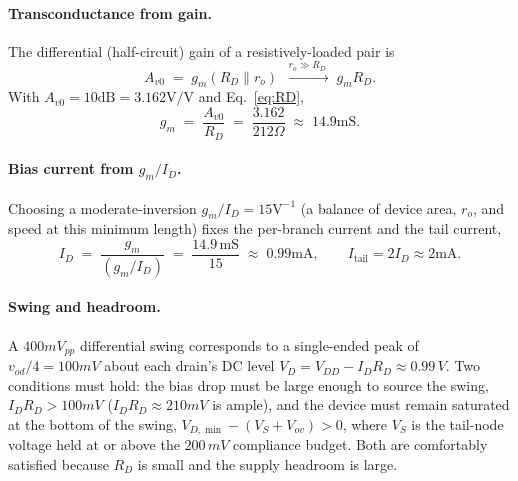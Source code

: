 \documentclass{article}
\begin{document}
\paragraph{Transconductance from gain.} The differential (half-circuit) gain of a
resistively-loaded pair is
\begin{equation}
    A_{v0} \;=\; g_m(R_D \| r_o) \;\xrightarrow{\;r_o \gg R_D\;}\; g_m R_D .
    \label{eq:gain}
\end{equation}
With $A_{v0}=10\mathrm{dB}=3.162\mathrm{V/V}$ and Eq.~\eqref{eq:RD},
\begin{equation}
    g_m \;=\; \frac{A_{v0}}{R_D} \;=\; \frac{3.162}{212\Omega} \;\approx\; 14.9\mathrm{mS}.
    \label{eq:gm}
\end{equation}

\paragraph{Bias current from $g_m/I_D$.} Choosing a moderate-inversion
$g_m/I_D = 15\mathrm{V^{-1}}$ (a balance of device area, $r_o$, and speed at this
minimum length) fixes the per-branch current and the tail current,
\begin{equation}
    I_D \;=\; \frac{g_m}{(g_m/I_D)} \;=\; \frac{14.9\,\mathrm{mS}}{15} \;\approx\; 0.99\mathrm{mA},
    \qquad I_{\text{tail}} = 2I_D \approx 2\mathrm{mA}.
\end{equation}

\paragraph{Swing and headroom.} A $400mV_{pp}$ differential swing corresponds to
a single-ended peak of $v_{od}/4 = 100mV$ about each drain's DC level
$V_D = V_{DD}-I_D R_D \approx 0.99\,V$. Two conditions must hold: the bias drop must be
large enough to source the swing, $I_D R_D > 100mV$ ($I_D R_D \approx 210mV$ is ample), and the
device must remain saturated at the bottom of the swing,
$V_{D,\min}-(V_S+V_{ov}) > 0$, where $V_S$ is the tail-node voltage held at or above the
$200\,mV$ compliance budget. Both are comfortably satisfied because $R_D$ is small and the
supply headroom is large.
\end{document}

